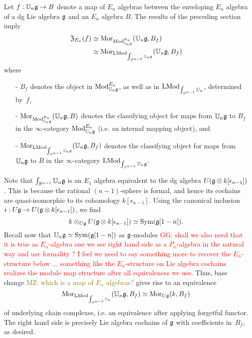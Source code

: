\documentclass[11pt]{amsart}
\numberwithin{equation}{section}
\def\mahmoud{\textcolor{olive}{MZ: }\textcolor{olive}}
\def\greg{\textcolor{red}{GG: }\textcolor{red}}
\begin{document}
Let $f: \mathbb U_n \mathfrak g \to B$ denote a map of $E_n$ algebras between the enveloping $E_n$ algebra of a dg Lie algebra $\mathfrak g$ and an $E_n$ algebra $B$.
The results of the preceding section imply
\begin{align*}
{\frak Z}_{E_n}(f) &\simeq {{\rm Mor}}_{{\rm Mod}^{E_n}_{\mathbb U_n\mathfrak g}}(\mathbb U_n \mathfrak g, B_f) \\
&\simeq {\rm Mor}_{{\rm LMod}_{\int_{S^{n-1}} \mathbb U_n\mathfrak g}}(\mathbb U_n \mathfrak g, B_f)
\end{align*}
where 
\begin{itemize}
\item[-] $B_f$ denotes the object in ${\rm Mod}^{E_n}_{\mathbb U_n\mathfrak g}$, as well as in ${\rm LMod}_{\int_{S^{n-1}}\mathbb U_n}$, determined by~$f$, 
\item[-] ${\rm Mor}_{{\rm Mod}^{E_n}_{\mathbb U_n\mathfrak g}}(\mathbb U_n \mathfrak g, B)$ denotes the classifying object for maps from $\mathbb U_n\mathfrak g$ to $B_f$ in the $\infty$-category ${\rm Mod}^{E_n}_{\mathbb U_n\mathfrak g}$ (i.e. an internal mapping object), and
\item[-] ${\rm Mor}_{{\rm LMod}_{\int_{S^{n-1}} \mathbb U_n\mathfrak g}} (\mathbb U_n \mathfrak g, B_f)$ denotes the classifying object for maps from ${\mathbb U_n\mathfrak g}$ to $B$ in the $\infty$-category ${\rm LMod}_{\int_{S^{n-1}}\mathbb U_n\mathfrak g}$.
\end{itemize}
Note that $\int_{S^{n-1}}\mathbb U_n\mathfrak g$ is an $E_1$ algebra equivalent to the dg algebra $U(\mathfrak g \otimes k[\epsilon_{n-1}])$.
This is because the rational $(n-1)$-sphere is formal, and hence its cochains are quasi-isomorphic to its cohomology $k[\epsilon_{n-1}]$.
Using the canonical inclusion $i: U\mathfrak g \to U(\mathfrak g \otimes k[\epsilon_{n-1}])$,
we find
\[
k \otimes_{U\mathfrak g} U(\mathfrak g \otimes k[\epsilon_{n-1}]) \simeq {\rm Sym}(\mathfrak g[1-n]).
\]
Recall now that $\mathbb U_n \mathfrak g \simeq {\rm Sym}(\mathfrak g[1-n])$ as $\mathfrak g$-modules \greg{shall we also need that it is true as $E_n$-algebra one we see right hand side as a $P_n$-algebra in the natural way and use formality ? I feel we need to say something more to recover the $E_n$-structure below ... something like the $E_n$-structure on Lie algebra cochains realizes the module map structure after all equivalences we use}.
Thus, base change \mahmoud{which is a map of $E_n$ algebras?} gives rise to an equivalence 
\[
{\rm Mor}_{{\rm LMod}_{\int_{S^{n-1}} \mathbb U_n}} (\mathbb U_n \mathfrak g, B_f)  \simeq {\rm Mor}_{U\mathfrak g} (k, B_f)
\]
of underlying chain complexes, i.e. an equivalence after applying forgetful functor. The right hand side is precisely Lie algebra cochains of $\mathfrak g$ with coefficients in~$B_f$, as desired.
\end{document}

